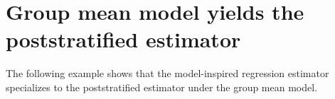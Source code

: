

\section{Group mean model yields the poststratified estimator}
\setcounter{theorem}{0}
\setcounter{equation}{0}


\renewcommand{\theenumi}{\roman{enumi}}
\renewcommand{\labelenumi}{\textnormal{(\theenumi)}$\;\;$}


The following example shows that the model-inspired regression estimator specializes to the poststratified estimator under the group mean model.
